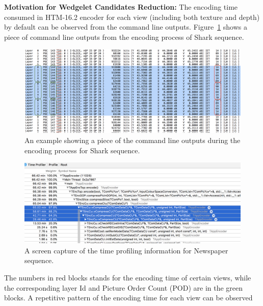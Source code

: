 \textbf{Motivation for Wedgelet Candidates Reduction:} The encoding time
consumed in HTM-16.2 encoder for
each view (including both texture and depth) by default can be
observed from the command line outputs.
Figure~\ref{fig:encoding-time-example} shows a piece of command line outputs
from the encoding process of Shark sequence.
\begin{figure}
    \centering
    \includegraphics[width=\textwidth,height=\textheight,keepaspectratio]{Figures/EncodingTimeEg}
    \caption[An example showing a piece of the command line outputs during
    the encoding process for Shark sequence]
    {An example showing a piece of the command line outputs during the
    encoding process for Shark sequence.
    }
    \label{fig:encoding-time-example}
\end{figure}
\begin{figure}[!b]
    \centering
    \includegraphics[width=\textwidth,height=\textheight,keepaspectratio]{Figures/major-time-spent-in-recursive-xcompresscu}
    \caption[A screen capture of the time profiling information for Newspaper sequence]
    {A screen capture of the time profiling information for Newspaper sequence.
    }
    \label{fig:major-time-spent-in-recursive-comresscu}
\end{figure}
The numbers in red blocks stands for the encoding time of certain views, while
the corresponding layer Id and Picture Order Count (POD) are in the green
blocks.
A repetitive pattern of the encoding time for each view can be observed
